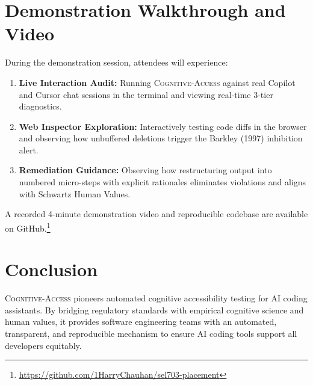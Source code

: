 \documentclass[conference]{IEEEtran}
\begin{document}
\section{Demonstration Walkthrough and Video}
During the demonstration session, attendees will experience:
\begin{enumerate}
    \item \textbf{Live Interaction Audit:} Running \textsc{Cognitive-Access} against real Copilot and Cursor chat sessions in the terminal and viewing real-time 3-tier diagnostics.
    \item \textbf{Web Inspector Exploration:} Interactively testing code diffs in the browser and observing how unbuffered deletions trigger the Barkley (1997) inhibition alert.
    \item \textbf{Remediation Guidance:} Observing how restructuring output into numbered micro-steps with explicit rationales eliminates violations and aligns with Schwartz Human Values.
\end{enumerate}
A recorded 4-minute demonstration video and reproducible codebase are available on GitHub.\footnote{\url{https://github.com/1HarryChauhan/sel703-placement}}

\section{Conclusion}
\textsc{Cognitive-Access} pioneers automated cognitive accessibility testing for AI coding assistants. By bridging regulatory standards with empirical cognitive science and human values, it provides software engineering teams with an automated, transparent, and reproducible mechanism to ensure AI coding tools support all developers equitably.
\end{document}
